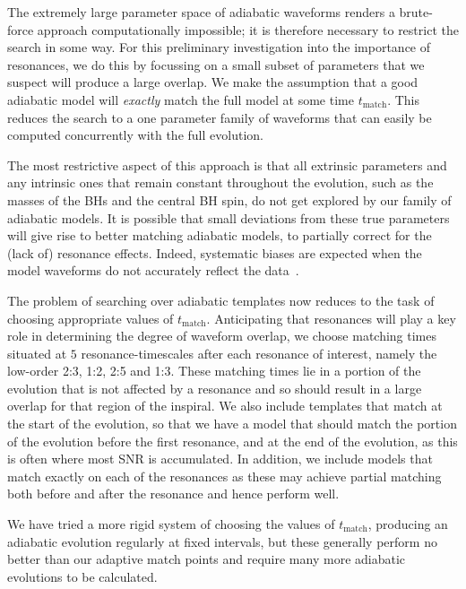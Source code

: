 \documentclass[aps,prd,amsfonts,amssymb,amsmath,nofootinbib,reprint,showpacs]{revtex4}
\begin{document}
The extremely large parameter space of adiabatic waveforms renders a brute-force approach computationally impossible; it is therefore necessary to restrict the search in some way. For this preliminary investigation into the importance of resonances, we do this by focussing on a small subset of parameters that we suspect will produce a large overlap. We make the assumption that a good adiabatic model will \emph{exactly} match the full model at some time $t_{\mathrm{match}}$. This reduces the search to a one parameter family of waveforms that can easily be computed concurrently with the full evolution.

The most restrictive aspect of this approach is that all extrinsic parameters and any intrinsic ones that remain constant throughout the evolution, such as the masses of the BHs and the central BH spin, do not get explored by our family of adiabatic models. It is possible that small deviations from these true parameters will give rise to better matching adiabatic models, to partially correct for the (lack of) resonance effects. Indeed, systematic biases are expected when the model waveforms do not accurately reflect the data~\cite{Cutler2007}.

The problem of searching over adiabatic templates now reduces to the task of choosing appropriate values of $t_{\mathrm{match}}$. Anticipating that resonances will play a key role in determining the degree of waveform overlap, we choose matching times situated at $5$ resonance-timescales after each resonance of interest, namely the low-order 2:3, 1:2, 2:5 and 1:3. These matching times lie in a portion of the evolution that is not affected by a resonance and so should result in a large overlap for that region of the inspiral. We also include templates that match at the start of the evolution, so that we have a model that should match the portion of the evolution before the first resonance, and at the end of the evolution, as this is often where most SNR is accumulated. In addition, we include models that match exactly on each of the resonances as these may achieve partial matching both before and after the resonance and hence perform well.

We have tried a more rigid system of choosing the values of $t_{\mathrm{match}}$, producing an adiabatic evolution regularly at fixed intervals, but these generally perform no better than our adaptive match points and require many more adiabatic evolutions to be calculated.
\end{document}
